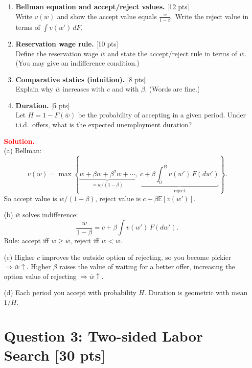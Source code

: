 \documentclass[12pt]{article}
\newenvironment{sol}{\par\smallskip\noindent \textcolor{red}{\textbf{Solution.}} \\ }{\par\medskip}
\newcommand{\pts}[1]{\hfill{\small[#1 pts]}}
\newcommand{\E}{\mathbb{E}}
\begin{document}
\begin{enumerate}[label=(\alph*)]
\item \textbf{Bellman equation and accept/reject values.} \pts{12}\\
Write \(v(w)\) and show the accept value equals \(\frac{w}{1-\beta}\).
Write the reject value in terms of \(\int v(w')\,dF\).

\item \textbf{Reservation wage rule.} \pts{10}\\
Define the reservation wage \(\bar w\) and state the accept/reject rule in terms of \(\bar w\).
(You may give an indifference condition.)

\item \textbf{Comparative statics (intuition).} \pts{8}\\
Explain why \(\bar w\) increases with \(c\) and with \(\beta\). (Words are fine.)

\item \textbf{Duration.} \pts{5}\\
Let \(H=1-F(\bar w)\) be the probability of accepting in a given period.
Under i.i.d.\ offers, what is the expected unemployment duration?
\end{enumerate}

\begin{sol}
(a) Bellman:
\[
v(w)=\max\left\{\underbrace{w+\beta w+\beta^2 w+\cdots}_{=w/(1-\beta)},\;
\underbrace{c+\beta\int_0^B v(w')\,F(dw')}_{\text{reject}}\right\}.
\]
So accept value is \(w/(1-\beta)\), reject value is \(c+\beta\E[v(w')]\).

(b) \(\bar w\) solves indifference:
\[
\frac{\bar w}{1-\beta}=c+\beta\int v(w')\,F(dw').
\]
Rule: accept iff \(w\ge \bar w\), reject iff \(w<\bar w\).

(c) Higher \(c\) improves the outside option of rejecting, so you become pickier \(\Rightarrow \bar w\uparrow\).
Higher \(\beta\) raises the value of waiting for a better offer, increasing the option value of rejecting \(\Rightarrow \bar w\uparrow\).

(d) Each period you accept with probability \(H\). Duration is geometric with mean \(1/H\).
\end{sol}

\section*{Question 3: Two-sided Labor Search \pts{30}}
\end{document}
